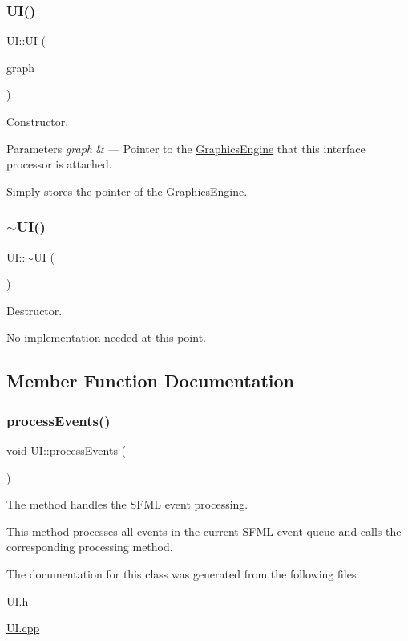 \subsubsection{\texorpdfstring{U\+I()}{UI()}}
{\footnotesize\ttfamily U\+I\+::\+UI (\begin{DoxyParamCaption}\item[{\hyperlink{class_graphics_engine}{Graphics\+Engine} $\ast$}]{graph }\end{DoxyParamCaption})}



Constructor. 


\begin{DoxyParams}{Parameters}
{\em graph} & --- Pointer to the \hyperlink{class_graphics_engine}{Graphics\+Engine} that this interface processor is attached.\\
\hline
\end{DoxyParams}
Simply stores the pointer of the \hyperlink{class_graphics_engine}{Graphics\+Engine}. \mbox{\label{class_u_i_a1b23d0c64c7cbb3d143d90ec532a7ccd}} 
\subsubsection{\texorpdfstring{$\sim$\+U\+I()}{~UI()}}
{\footnotesize\ttfamily U\+I\+::$\sim$\+UI (\begin{DoxyParamCaption}{ }\end{DoxyParamCaption})}



Destructor. 

No implementation needed at this point. 

\subsection{Member Function Documentation}
\mbox{\label{class_u_i_a440e133dbf19d82b8b40809644494068}} 
\subsubsection{\texorpdfstring{process\+Events()}{processEvents()}}
{\footnotesize\ttfamily void U\+I\+::process\+Events (\begin{DoxyParamCaption}{ }\end{DoxyParamCaption})}



The method handles the S\+F\+ML event processing. 

This method processes all events in the current S\+F\+ML event queue and calls the corresponding processing method. 

The documentation for this class was generated from the following files\+:\begin{DoxyCompactItemize}
\item 
\hyperlink{_u_i_8h}{U\+I.\+h}\item 
\hyperlink{_u_i_8cpp}{U\+I.\+cpp}\end{DoxyCompactItemize}

